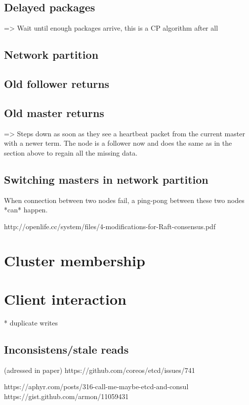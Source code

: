 \subsection{Delayed packages}
=> Wait until enough packages arrive, this is a CP algorithm after all

\subsection{Network partition}

\subsection{Old follower returns}


\subsection{Old master returns}
=> Steps down as soon as they see a heartbeat packet from the current master with a newer term.
The node is a follower now and does the same as in the section above to regain all the missing data.

\subsection{Switching masters in network partition}
When connection between two nodes fail, a ping-pong between these two nodes *can* happen.

http://openlife.cc/system/files/4-modifications-for-Raft-consensus.pdf

\section{Cluster membership}

\section{Client interaction}

* duplicate writes



\subsection{Inconsistens/stale reads}
(adressed in paper)
https://github.com/coreos/etcd/issues/741

https://aphyr.com/posts/316-call-me-maybe-etcd-and-consul
https://gist.github.com/armon/11059431

